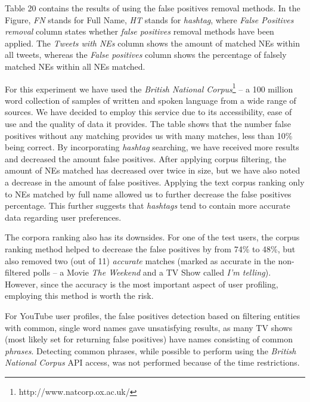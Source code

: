 Table 20 contains the results of using the false positives removal methods. In the Figure,
\textit{FN} stands for Full Name, \textit{HT} stands for \textit{hashtag}, where \textit{False Positives removal}
column states whether \textit{false positives} removal methods have been applied.
The \textit{Tweets with NEs} column shows the amount of matched NEs within all tweets, whereas
the \textit{False positives} column shows the percentage of falsely matched
NEs within all NEs matched.

For this experiment we have used the \textit{British National Corpus}\footnote{http://www.natcorp.ox.ac.uk/} --
a 100 million word collection of samples of written and spoken language from a wide range of sources. We have
decided to employ this service due to its accessibility, ease of use and the quality of data it provides.
The table shows that the number false positives without any matching provides us with many matches, less than
10\% being correct. By incorporating \textit{hashtag} searching, we have received more results and decreased the amount
false positives. After applying corpus filtering, the amount of NEs matched has decreased over twice in size,
but we have also noted a decrease in the amount of false positives. Applying the text corpus ranking only to
NEs matched by full name allowed us to further decrease the false positives percentage.
This further suggests that \textit{hashtags} tend to contain more accurate data regarding user preferences.

The corpora ranking also has its downsides. For one of the test users, the corpus ranking method helped to
decrease the false positives by from 74\% to 48\%, but also removed two (out of 11) \textit{accurate} matches (marked as
accurate in the non-filtered polls -- a Movie \textit{The Weekend} and a TV Show called \textit{I'm telling}).
However, since the accuracy is the most important aspect of user profiling, employing this method is worth
the risk.

For YouTube user profiles, the false positives detection based on filtering
entities with common, single word names gave unsatisfying results, as many TV
shows (most likely set for returning false positives) have names consisting of
common \textit{phrases}. Detecting common phrases, while possible to perform
using the \textit{British National Corpus} API access, was not performed because
of the time restrictions.

